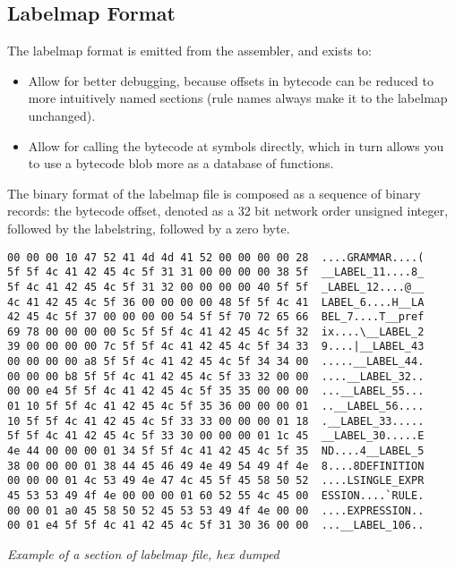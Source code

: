 \subsection{Labelmap Format}

The labelmap format is emitted from the assembler, and exists to:

\begin{itemize}
\item Allow for better debugging, because offsets in bytecode can be reduced
      to more intuitively named sections (rule names always make it to
      the labelmap unchanged).
\item Allow for calling the bytecode at symbols directly, which in turn
      allows you to use a bytecode blob more as a database of functions.
\end{itemize}

The binary format of the labelmap file is composed as a sequence of
binary records: the bytecode offset, denoted as a 32 bit network order
unsigned integer, followed by the labelstring, followed by a zero byte.

\begin{myquote}
\begin{verbatim}
00 00 00 10 47 52 41 4d 4d 41 52 00 00 00 00 28  ....GRAMMAR....(
5f 5f 4c 41 42 45 4c 5f 31 31 00 00 00 00 38 5f  __LABEL_11....8_
5f 4c 41 42 45 4c 5f 31 32 00 00 00 00 40 5f 5f  _LABEL_12....@__
4c 41 42 45 4c 5f 36 00 00 00 00 48 5f 5f 4c 41  LABEL_6....H__LA
42 45 4c 5f 37 00 00 00 00 54 5f 5f 70 72 65 66  BEL_7....T__pref
69 78 00 00 00 00 5c 5f 5f 4c 41 42 45 4c 5f 32  ix....\__LABEL_2
39 00 00 00 00 7c 5f 5f 4c 41 42 45 4c 5f 34 33  9....|__LABEL_43
00 00 00 00 a8 5f 5f 4c 41 42 45 4c 5f 34 34 00  .....__LABEL_44.
00 00 00 b8 5f 5f 4c 41 42 45 4c 5f 33 32 00 00  ....__LABEL_32..
00 00 e4 5f 5f 4c 41 42 45 4c 5f 35 35 00 00 00  ...__LABEL_55...
01 10 5f 5f 4c 41 42 45 4c 5f 35 36 00 00 00 01  ..__LABEL_56....
10 5f 5f 4c 41 42 45 4c 5f 33 33 00 00 00 01 18  .__LABEL_33.....
5f 5f 4c 41 42 45 4c 5f 33 30 00 00 00 01 1c 45  __LABEL_30.....E
4e 44 00 00 00 01 34 5f 5f 4c 41 42 45 4c 5f 35  ND....4__LABEL_5
38 00 00 00 01 38 44 45 46 49 4e 49 54 49 4f 4e  8....8DEFINITION
00 00 00 01 4c 53 49 4e 47 4c 45 5f 45 58 50 52  ....LSINGLE_EXPR
45 53 53 49 4f 4e 00 00 00 01 60 52 55 4c 45 00  ESSION....`RULE.
00 00 01 a0 45 58 50 52 45 53 53 49 4f 4e 00 00  ....EXPRESSION..
00 01 e4 5f 5f 4c 41 42 45 4c 5f 31 30 36 00 00  ...__LABEL_106..

\end{verbatim}
\end{myquote}
\textit{Example of a section of labelmap file, hex dumped}

